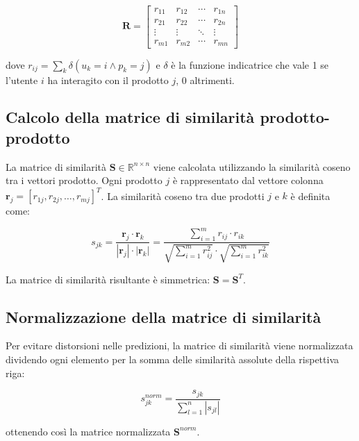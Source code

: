 \begin{equation}
\mathbf{R} = \begin{bmatrix}
r_{11} & r_{12} & \cdots & r_{1n} \\
r_{21} & r_{22} & \cdots & r_{2n} \\
\vdots & \vdots & \ddots & \vdots \\
r_{m1} & r_{m2} & \cdots & r_{mn}
\end{bmatrix}
\end{equation}

dove $r_{ij} = \sum_{k} \delta(u_k = i \land p_k = j)$ e $\delta$ è la funzione indicatrice che vale 1 se l'utente $i$ ha interagito con il prodotto $j$, 0 altrimenti.

\subsection{Calcolo della matrice di similarità prodotto-prodotto}

La matrice di similarità $\mathbf{S} \in \mathbb{R}^{n \times n}$ viene calcolata utilizzando la similarità coseno tra i vettori prodotto. Ogni prodotto $j$ è rappresentato dal vettore colonna $\mathbf{r}_j = [r_{1j}, r_{2j}, \ldots, r_{mj}]^T$. La similarità coseno tra due prodotti $j$ e $k$ è definita come:

\begin{equation}
s_{jk} = \frac{\mathbf{r}_j \cdot \mathbf{r}_k}{|\mathbf{r}_j| \cdot |\mathbf{r}_k|} = \frac{\sum_{i=1}^{m} r_{ij} \cdot r_{ik}}{\sqrt{\sum_{i=1}^{m} r_{ij}^2} \cdot \sqrt{\sum_{i=1}^{m} r_{ik}^2}}
\end{equation}

La matrice di similarità risultante è simmetrica: $\mathbf{S} = \mathbf{S}^T$.

\subsection{Normalizzazione della matrice di similarità}

Per evitare distorsioni nelle predizioni, la matrice di similarità viene normalizzata dividendo ogni elemento per la somma delle similarità assolute della rispettiva riga:

\begin{equation}
s_{jk}^{norm} = \frac{s_{jk}}{\sum_{l=1}^{n} |s_{jl}|}
\end{equation}

ottenendo così la matrice normalizzata $\mathbf{S}^{norm}$.

